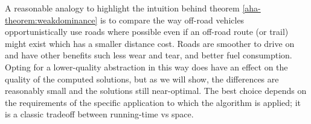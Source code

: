 \par \indent
A reasonable analogy to highlight the intuition behind theorem \ref{aha-theorem:weakdominance} is to compare the way off-road vehicles opportunistically use roads where possible even if an off-road route (or trail) might exist which has a smaller distance cost. Roads are smoother to drive on and have other benefits such less wear and tear, and better fuel consumption. Opting for a lower-quality abstraction in this way does have an effect on the quality of the computed solutions, but as we will show, the differences are reasonably small and the solutions still near-optimal. The best choice depends on the requirements of the specific application to which the algorithm is applied; it is a classic tradeoff between running-time vs space.
